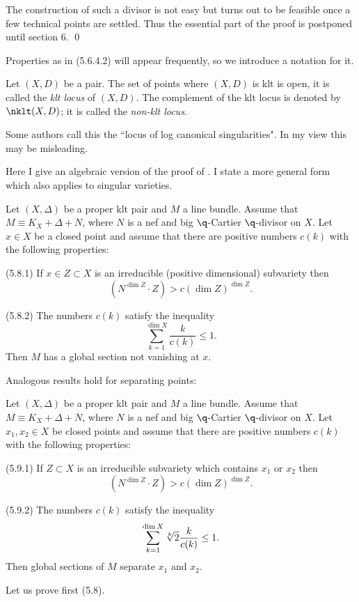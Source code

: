 The construction of such a divisor is not easy but turns out to be
feasible once a few technical points are settled. Thus the essential part of
the proof is postponed until section 6. \qed\enddemo




Properties as in (5.6.4.2) will appear frequently, so we introduce a notation
for it.

  Let $(X,D)$ be a pair. The set of points where $(X,D)$
is klt is open, it is called the {\it klt locus} of $(X,D)$.  The complement of
the klt locus is denoted by $\nklt(X,D)$; it is called the {\it non-klt
locus}.

Some  authors call this the ``locus of log canonical singularities". In
my view this may be  misleading. 
\enddemo


Here I give an algebraic version of the proof of \cite{Angehrn-Siu95}. I
state a  more general form which also applies to singular varieties.


 Let $(X,\Delta)$ be a proper klt pair and  $M$  a
line bundle. Assume that $M\equiv K_X+\Delta+N$, where $N$ is  a nef and big
$\q$-Cartier
$\q$-divisor on
$X$. Let
$x\in X$ be a closed point and assume that    there are positive numbers
$c(k)$ with the following properties:

(5.8.1) If
$x\in Z\subset X$  is an irreducible (positive dimensional) subvariety then 
$$
(N^{\dim Z}\cdot Z)>c(\dim Z)^{\dim Z}.
$$ 

(5.8.2) The numbers $c(k)$ satisfy the inequality
$$
\sum_{k=1}^{\dim X} \frac{k}{c(k)}\leq 1.
$$
Then $M$ has a global section not vanishing at $x$.
\endproclaim


Analogous results hold for separating points:

 Let $(X,\Delta)$ be a proper klt pair and  $M$  a
line bundle. Assume that $M\equiv K_X+\Delta+N$, where $N$ is  a nef and big
$\q$-Cartier
$\q$-divisor on
$X$. Let
$x_1,x_2\in X$ be  closed points and assume that    there are positive numbers
$c(k)$ with the following properties:

(5.9.1) If
$Z\subset X$  is an irreducible subvariety which contains $x_1$ or $x_2$ then 
$$
(N^{\dim Z}\cdot Z)>c(\dim Z)^{\dim Z}.
$$ 

(5.9.2) The numbers $c(k)$ satisfy the inequality
$$
\sum_{k=1}^{\dim X} \root{k}\of{2}\frac{k}{c(k)}\leq 1.
$$
\noindent Then global sections of $M$ separate $x_1$ and $x_2$.
\endproclaim


\demop Let us prove first (5.8). 

